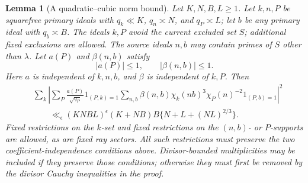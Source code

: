 \documentclass[11pt,a4paper]{article}
\numberwithin{equation}{section}
\numberwithin{figure}{section}
\newtheorem{lemma}[theorem]{Lemma}
\theoremstyle{definition}
\theoremstyle{remark}
\begin{document}
\begin{lemma}[A quadratic--cubic norm bound]\label{lem:hybrid-energy}
Let \(K,N,B,L\ge1\).  Let \(k,n,P\) be squarefree primary ideals with
\(q_k\ll K\), \(q_n\asymp N\), and \(q_P\asymp L\); let \(b\) be any
primary ideal with \(q_b\asymp B\).  The ideals \(k,P\) avoid the current
excluded set \(S\); additional fixed exclusions are allowed.  The source
ideals \(n,b\) may contain primes of \(S\) other than \(\lambda\).
Let \(a(P)\) and \(\beta(n,b)\)
satisfy
\[
 |a(P)|\le1,\qquad |\beta(n,b)|\le1.
\]
Here \(a\) is independent of \(k,n,b\), and \(\beta\) is independent of
\(k,P\).  Then
\begin{equation}\label{old-eq:4.6b}
 \begin{split}
 &\sum_k\left|
 \sum_P\frac{a(P)}{\sqrt{q_P}}1_{(P,k)=1}
 \sum_{n,b}\beta(n,b)\chi_k(nb)^3
                 \chi_P(n)^{-2}1_{(P,b)=1}
 \right|^2\\
 &\qquad\ll_\epsilon
 (KNBL)^\epsilon(K+NB)B\{N+L+(NL)^{2/3}\}.
 \end{split}
\end{equation}
Fixed restrictions on the \(k\)-set and fixed restrictions on the
\((n,b)\)- or \(P\)-supports are allowed, as are fixed ray sectors.
All such restrictions must preserve the two coefficient-independence
conditions above.  Divisor-bounded multiplicities may be included if
they preserve those conditions; otherwise they must first be removed by
the divisor Cauchy inequalities in the proof.
\end{lemma}
\end{document}
